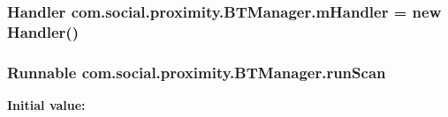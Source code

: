 \subsubsection[{m\+Handler}]{\setlength{\rightskip}{0pt plus 5cm}Handler com.\+social.\+proximity.\+B\+T\+Manager.\+m\+Handler = new Handler()\hspace{0.3cm}{\ttfamily [private]}}\label{classcom_1_1social_1_1proximity_1_1_b_t_manager_ad4f36a6603245d52ad541109d6c51ecf}
\hypertarget{classcom_1_1social_1_1proximity_1_1_b_t_manager_a6c26e87740201562e328883a23fb47cd}{}
\subsubsection[{run\+Scan}]{\setlength{\rightskip}{0pt plus 5cm}Runnable com.\+social.\+proximity.\+B\+T\+Manager.\+run\+Scan\hspace{0.3cm}{\ttfamily [private]}}\label{classcom_1_1social_1_1proximity_1_1_b_t_manager_a6c26e87740201562e328883a23fb47cd}
{\bfseries Initial value\+:}
